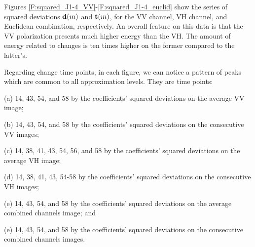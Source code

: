 \documentclass[journal]{IEEEtran}
\newcommand{\vd}{{\textbf d}}
\newcommand{\vt}{{\textbf t}}
\begin{document}
Figures \ref{F:squared_J1-4_VV}-\ref{F:squared_J1-4_euclid} show the series of squared deviations $\vd(m)$ and $\vt(m)$, for  the VV channel, VH channel, and Euclidean combination, respectively.  An overall feature on this data is that the VV polarization presents much higher energy than the VH. The amount of energy related to changes  is ten times higher on the former compared to the latter's.

Regarding change time points, in each figure, we can notice a pattern of peaks which are common to all approximation levels. They are time points:
\begin{list}{}{}
\item (a) 14, 43, 54, and 58 by the coefficients' squared deviations on the average VV image;
\item (b) 14, 43, 54, and 58 by the coefficients' squared deviations on the consecutive VV images;
\item (c) 14, 38, 41, 43, 54, 56, and 58 by the coefficients' squared deviations on the average VH image;
\item (d) 14, 38, 41, 43, 54-58 by the coefficients' squared deviations on the consecutive VH images;
\item (e) 14, 43, 54, and 58 by the coefficients' squared deviations on the average combined channels image; and
\item (e) 14, 43, 54, and 58 by the coefficients' squared deviations on the consecutive combined channels images.
\end{list}
\end{document}

